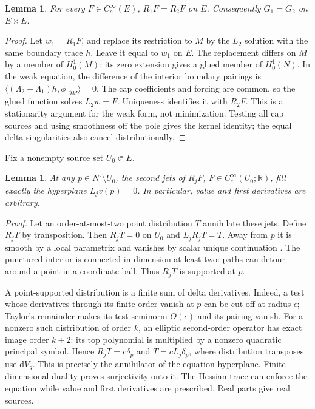 \documentclass[11pt]{article}
\newtheorem{lemma}[theorem]{Lemma}
\theoremstyle{definition}\newtheorem{definition}[theorem]{Definition}
\theoremstyle{remark}\newtheorem{remark}[theorem]{Remark}
\newcommand{\dd}{\mathrm d}
\newcommand{\vol}{\dd V}
\newcommand{\ip}[2]{\langle #1,#2\rangle}
\begin{document}
\begin{lemma}\label{lem:cap}
For every $F\in C_c^\infty(E)$, $R_1F=R_2F$ on $E$.
Consequently $G_1=G_2$ on $E\times E$.
\end{lemma}
\begin{proof}
Let $w_1=R_1F$, and replace its restriction to $M$ by the $L_2$ solution
with the same boundary trace $h$. Leave it equal to $w_1$ on $E$.
The replacement differs on $M$ by a member of $H^1_0(M)$; its zero
extension gives a glued member of $H^1_0(N)$. In the weak equation,
the difference of the interior boundary pairings is
$\ip{(\Lambda_2-\Lambda_1)h}{\phi|_{\partial M}}=0$.
The cap coefficients and forcing are common, so the glued function solves
$L_2w=F$. Uniqueness identifies it with $R_2F$.
This is a stationarity argument for the weak form, not minimization.
Testing all cap sources and using smoothness off the pole gives the kernel
identity; the equal delta singularities also cancel distributionally.
\end{proof}

Fix a nonempty source set $U_0\Subset E$.
\begin{lemma}\label{lem:jets}
At any $p\in N^\circ\setminus\overline{U_0}$, the second jets of
$R_jF$, $F\in C_c^\infty(U_0;\mathbb R)$, fill exactly the hyperplane
$L_jv(p)=0$. In particular, value and first derivatives are arbitrary.
\end{lemma}
\begin{proof}
Let an order-at-most-two point distribution $T$ annihilate these jets.
Define $R_jT$ by transposition. Then $R_jT=0$ on $U_0$ and
$L_jR_jT=T$. Away from $p$ it is smooth by a local parametrix and vanishes
by scalar unique continuation \cite{Aronszajn}. The punctured interior
is connected in dimension at least two: paths can detour around a point
in a coordinate ball. Thus $R_jT$ is supported at $p$.

A point-supported distribution is a finite sum of delta derivatives.
Indeed, a test whose derivatives through its finite order vanish at $p$
can be cut off at radius $\epsilon$; Taylor's remainder makes its test
seminorm $O(\epsilon)$ and its pairing vanish. For a nonzero such
distribution of order $k$, an elliptic second-order operator has exact
image order $k+2$: its top polynomial is multiplied by a nonzero
quadratic principal symbol. Hence $R_jT=c\delta_p$ and $T=cL_j\delta_p$,
where distribution transposes use $\vol_g$. This is precisely the
annihilator of the equation hyperplane. Finite-dimensional duality proves
surjectivity onto it. The Hessian trace can enforce the equation while
value and first derivatives are prescribed. Real parts give real sources.
\end{proof}
\end{document}
